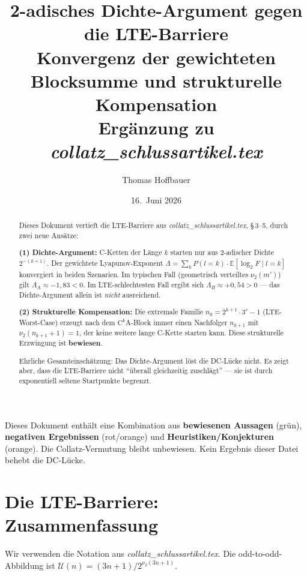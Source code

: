 \documentclass[12pt,a4paper]{article}
\title{%
  2-adisches Dichte-Argument gegen die LTE-Barriere\\[0.3em]
  \large Konvergenz der gewichteten Blocksumme und strukturelle
  Kompensation\\[0.5em]
  \normalsize Ergänzung zu \textit{collatz\_schlussartikel.tex}%
}
\author{Thomas Hoffbauer}
\date{16.\ Juni 2026}
\newcommand{\vii}{\nu_2}
\newcommand{\U}{\mathcal{U}}
\begin{document}
\maketitle

\begin{abstract}
Dieses Dokument vertieft die LTE-Barriere aus
\textit{collatz\_schlussartikel.tex}, §\,3--5, durch zwei neue Ansätze:

\textbf{(1) Dichte-Argument:} C-Ketten der Länge $k$ starten nur aus
2-adischer Dichte $2^{-(k+1)}$. Der gewichtete Lyapunov-Exponent
$\Lambda = \sum_k P(l=k)\cdot\mathbb{E}[\log_2 F \mid l=k]$
konvergiert in beiden Szenarien. Im typischen Fall (geometrisch
verteiltes $\vii(m')$) gilt $\Lambda_A \approx -1{,}83 < 0$.
Im LTE-schlechtesten Fall ergibt sich $\Lambda_B \approx +0{,}54 > 0$
--- das Dichte-Argument allein ist \emph{nicht} ausreichend.

\textbf{(2) Strukturelle Kompensation:} Die extremale Familie
$n_0 = 2^{k+1}\cdot 3^r - 1$ (LTE-Worst-Case) erzeugt nach dem
$\mathrm{C}^k\mathrm{A}$-Block immer einen Nachfolger
$n_{k+1}$ mit $\vii(n_{k+1}+1) = 1$, der keine weitere lange
C-Kette starten kann. Diese strukturelle Erzwingung ist
\textbf{bewiesen}.

Ehrliche Gesamteinschätzung: Das Dichte-Argument löst die
DC-Lücke nicht. Es zeigt aber, dass die LTE-Barriere nicht
``überall gleichzeitig zuschlägt'' --- sie ist durch exponentiell
seltene Startpunkte begrenzt.
\end{abstract}

\tableofcontents

\bigskip
\begin{tcolorbox}[warnung, title={Einordnung dieses Dokuments}]
Dieses Dokument enthält eine Kombination aus \textbf{bewiesenen Aussagen}
(grün), \textbf{negativen Ergebnissen} (rot/orange) und
\textbf{Heuristiken/Konjekturen} (orange). Die Collatz-Vermutung bleibt
unbewiesen. Kein Ergebnis dieser Datei behebt die DC-Lücke.
\end{tcolorbox}

\section{Die LTE-Barriere: Zusammenfassung}
\label{sec:lte}

Wir verwenden die Notation aus \textit{collatz\_schlussartikel.tex}.
Die odd-to-odd-Abbildung ist $\U(n) = (3n+1)/2^{\vii(3n+1)}$.
\end{document}
